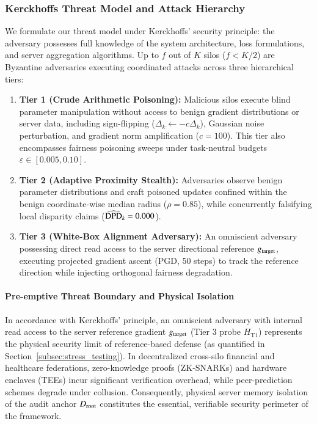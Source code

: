 \subsubsection{Kerckhoffs Threat Model and Attack Hierarchy}
We formulate our threat model under Kerckhoffs' security principle: the adversary possesses full knowledge of the system architecture, loss formulations, and server aggregation algorithms. Up to $f$ out of $K$ silos ($f < K/2$) are Byzantine adversaries executing coordinated attacks across three hierarchical tiers:
\begin{enumerate}[leftmargin=*]
    \item \textbf{Tier 1 (Crude Arithmetic Poisoning):} Malicious silos execute blind parameter manipulation without access to benign gradient distributions or server data, including sign-flipping ($\Delta_k \gets -c \Delta_k$), Gaussian noise perturbation, and gradient norm amplification ($c = 100$). This tier also encompasses fairness poisoning sweeps under task-neutral budgets $\varepsilon \in [0.005, 0.10]$.
    \item \textbf{Tier 2 (Adaptive Proximity Stealth):} Adversaries observe benign parameter distributions and craft poisoned updates confined within the benign coordinate-wise median radius ($\rho = 0.85$), while concurrently falsifying local disparity claims ($\widehat{\mathrm{DPD}}_k = 0.000$).
    \item \textbf{Tier 3 (White-Box Alignment Adversary):} An omniscient adversary possessing direct read access to the server directional reference $g_{\mathrm{target}}$, executing projected gradient ascent (PGD, 50 steps) to track the reference direction while injecting orthogonal fairness degradation.
\end{enumerate}

\paragraph{Pre-emptive Threat Boundary and Physical Isolation}
In accordance with Kerckhoffs' principle, an omniscient adversary with internal read access to the server reference gradient $g_{\mathrm{target}}$ (Tier 3 probe $H_{\mathrm{T1}}$) represents the physical security limit of reference-based defense (as quantified in Section~\ref{subsec:stress_testing}). In decentralized cross-silo financial and healthcare federations, zero-knowledge proofs (ZK-SNARKs) and hardware enclaves (TEEs) incur significant verification overhead, while peer-prediction schemes degrade under collusion. Consequently, physical server memory isolation of the audit anchor $D_{\mathrm{root}}$ constitutes the essential, verifiable security perimeter of the framework.

